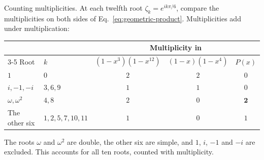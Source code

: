 \documentclass[11pt,aspectratio=169]{beamer}
\newcommand{\slidebody}{%
  \fontsize{10.6}{12.8}\selectfont\justifying%
  \setlength{\parskip}{4.2pt}%
  \setlength{\abovedisplayskip}{4pt}%
  \setlength{\belowdisplayskip}{4pt}%
  \setlength{\abovedisplayshortskip}{2pt}%
  \setlength{\belowdisplayshortskip}{2.5pt}%
}
\newcommand{\tightbody}{\slidebody\fontsize{10.2}{12.3}\selectfont\setlength{\parskip}{3pt}}
\begin{document}
\begin{frame}[t]{Counting multiplicities.}
\tightbody
At each twelfth root $\zeta_k=e^{ik\pi/6}$, compare the multiplicities on both sides of Eq.~\eqref{eq:geometric-product}. Multiplicities add under multiplication:
\begin{center}
\renewcommand{\arraystretch}{1.05}
\fontsize{9.25}{11.1}\selectfont
\begin{tabular}{@{}llccc@{}}
\toprule
 & & \multicolumn{3}{c}{Multiplicity in}\tabularnewline
\cmidrule(l){3-5}
Root & $k$ & $(1-x^3)(1-x^{12})$ & $(1-x)(1-x^4)$ & $P(x)$\\
\midrule
$1$ & $0$ & $2$ & $2$ & $0$\\
$i,-1,-i$ & $3,6,9$ & $1$ & $1$ & $0$\\
$\omega,\omega^2$ & $4,8$ & $2$ & $0$ & $\mathbf 2$\\
The other six & $1,2,5,7,10,11$ & $1$ & $0$ & $1$\\
\bottomrule
\end{tabular}
\end{center}
The roots $\omega$ and $\omega^2$ are double, the other six are simple, and $1$, $i$, $-1$ and $-i$ are excluded. This accounts for all ten roots, counted with multiplicity.
\end{frame}
\end{document}
